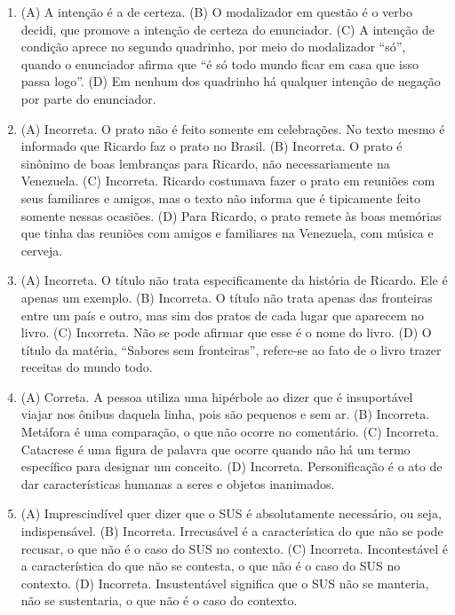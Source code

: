 
\begin{enumerate}
\item (A) A intenção é a de certeza.
(B) O modalizador em questão é o verbo decidi, que promove a intenção de
certeza do enunciador.
(C) A intenção de condição aprece no segundo quadrinho, por meio do
modalizador ``só'', quando o enunciador afirma que ``é só todo mundo
ficar em casa que isso passa logo''.
(D) Em nenhum dos quadrinho há qualquer intenção de negação por parte do
enunciador.

\item (A) Incorreta. O prato não é feito somente em celebrações. No texto mesmo
é informado que Ricardo faz o prato no Brasil.
(B) Incorreta. O prato é sinônimo de boas lembranças para Ricardo, não
necessariamente na Venezuela.
(C) Incorreta. Ricardo costumava fazer o prato em reuniões com seus
familiares e amigos, mas o texto não informa que é tipicamente feito
somente nessas ocasiões.
(D) Para Ricardo, o prato remete às boas memórias que tinha das reuniões
com amigos e familiares na Venezuela, com música e cerveja.

\item (A) Incorreta. O título não trata especificamente da história de Ricardo.
Ele é apenas um exemplo.
(B) Incorreta. O título não trata apenas das fronteiras entre um país e
outro, mas sim dos pratos de cada lugar que aparecem no livro.
(C) Incorreta. Não se pode afirmar que esse é o nome do livro.
(D) O título da matéria, ``Sabores sem fronteiras'', refere-se ao fato de
o livro trazer receitas do mundo todo.

\item (A) Correta. A pessoa utiliza uma hipérbole ao dizer que é insuportável
viajar nos ônibus daquela linha, pois são pequenos e sem ar.
(B) Incorreta. Metáfora é uma comparação, o que não ocorre no comentário.
(C) Incorreta. Catacrese é uma figura de palavra que ocorre quando não há
um termo específico para designar um conceito.
(D) Incorreta. Personificação é o ato de dar características humanas a
seres e objetos inanimados.

\item (A) Imprescindível quer dizer que o SUS é absolutamente necessário, ou
seja, indispensável.
(B) Incorreta. Irrecusável é a característica do que não se pode recusar,
o que não é o caso do SUS no contexto.
(C) Incorreta. Incontestável é a característica do que não se contesta, o
que não é o caso do SUS no contexto.
(D) Incorreta. Insustentável significa que o SUS não se manteria, não se
sustentaria, o que não é o caso do contexto.


\end{enumerate}
